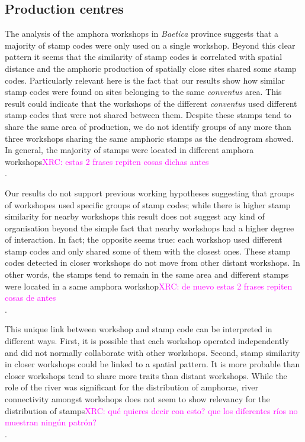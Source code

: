 \documentclass[review]{elsarticle}
\newcommand{\memo}[2]{\textcolor{#1}{#2}}
\newcommand{\xavi}[1]{\memo{magenta}{XRC: #1\\}}
\begin{document}
\subsection{Production centres}

The analysis of the amphora workshops in \textit{Baetica} province suggests that a majority of stamp codes were only used on a single workshop. Beyond this clear pattern it seems that the similarity of stamp codes is correlated with spatial distance and the amphoric production of spatially close sites shared some stamp codes. Particularly relevant here is the fact that our results show how similar stamp codes were found on sites belonging to the same \textit{conventus} area. This result could indicate that the workshops of the different \textit{conventus} used different stamp codes that were not shared between them. Despite these stamps tend to share the same area of production, we do not identify groups of any more than three workshops sharing the same amphoric stamps as the dendrogram showed. In general, the majority of stamps were located in different amphora workshops\xavi{estas 2 frases repiten cosas dichas antes}. 

Our results do not support previous working hypotheses suggesting that groups of workshopes used specific groups of stamp codes; while there is higher stamp similarity for nearby workshops this result does not suggest any kind of organisation beyond the simple fact that nearby workshops had a higher degree of interaction. In fact; the opposite seems true: each workshop used different stamp codes and only shared some of them with the closest ones. These stamp codes detected in closer workshops do not move from other distant workshops. In other words, the stamps tend to remain in the same area and different stamps were located in a same amphora workshop\xavi{de nuevo estas 2 frases repiten cosas de antes}. 

This unique link between workshop and stamp code can be interpreted in different ways. First, it is possible that each workshop operated independently and did not normally collaborate with other workshops.  Second, stamp similarity in closer workshops could be linked to a spatial pattern. It is more probable than closer workshops tend to share more traits than distant workshops. While the role of the river was significant for the distribution of amphorae, river connectivity amongst workshops does not seem to show relevancy for the distribution of stamps\xavi{qué quieres decir con esto? que los diferentes ríos no muestran ningún patrón?}.
\end{document}
